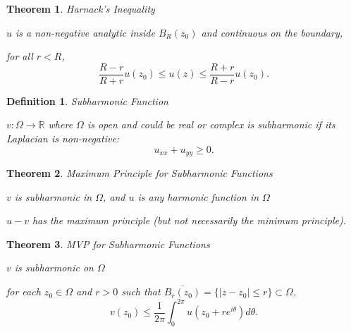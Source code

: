 \documentclass[12pt]{Qual}
\newtheorem{theorem}{Theorem}
\newtheorem{definition}{Definition}
\begin{document}
\vspace{0.5cm}
\begin{theorem}{\Large\textit{Harnack's Inequality}}

 $u$ is a \textit{non-negative} analytic inside $B_R(z_0)$ and continuous on the boundary,

 for all $r<R$, $$\frac{R-r}{R+r}u(z_0)\le u(z)\le\frac{R+r}{R-r}u(z_0).$$

\end{theorem}
\vspace{0.5cm}
\begin{definition}{\Large\textit{Subharmonic Function}}

$v:\Omega\to\mathbb{R}$ where $\Omega$ is open and could be real or complex is subharmonic if its Laplacian is non-negative: $$u_{xx}+u_{yy}\ge0.$$

\end{definition}
\vspace{0.5cm}
\begin{theorem}{\Large\textit{Maximum Principle for Subharmonic Functions}}

$v$ is subharmonic in $\Omega$, and $u$ is any harmonic function in $\Omega$

 \begin{minipage}{0.85\textwidth}
\vspace{0.45cm}
$u-v$ has the maximum principle (but not necessarily the minimum principle).
\end{minipage}

\end{theorem}
\vspace{0.5cm}
\begin{theorem}{\Large\textit{MVP for Subharmonic Functions}}

$v$ is subharmonic on $\Omega$

 for each $z_0\in\Omega$ and $r>0$ such that $\overline{B_r(z_0)}=\{|z-z_0|\le r\}\subset\Omega$, $$v(z_0)\le \frac{1}{2\pi}\int_0^{2\pi}u(z_0+re^{i\theta})d\theta.$$

\end{theorem}
\vspace{0.5cm}
\newpage
\end{document}
